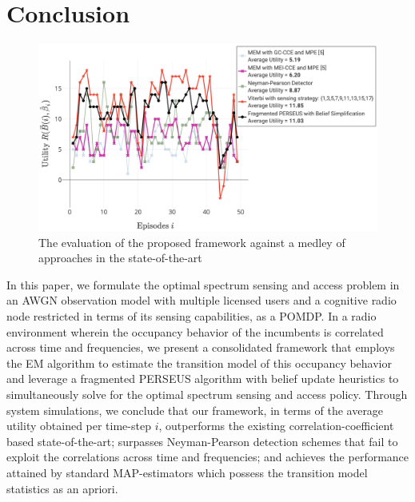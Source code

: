 \documentclass[10pt,twocolumn]{IEEEtran}
\begin{document}
\section{Conclusion}\label{V}
\begin{figure}
    \centering
    \includegraphics[width=0.95\linewidth]{PerformanceEvaluation.png}
    \caption{The evaluation of the proposed framework against a medley of approaches in the state-of-the-art}
    \vspace{-5mm}
    \label{fig:7}
\end{figure}

In this paper, we formulate the optimal spectrum sensing and access problem in an AWGN observation model with multiple licensed users and a cognitive radio node restricted in terms of its sensing capabilities, as a POMDP. In a radio environment wherein the occupancy behavior of the incumbents is correlated across time and frequencies, we present a consolidated framework that employs the EM algorithm to estimate the transition model of this occupancy behavior and leverage a fragmented PERSEUS algorithm with belief update heuristics to simultaneously solve for the optimal spectrum sensing and access policy. Through system simulations, we conclude that our framework, in terms of the average utility obtained per time-step $i$, outperforms the existing correlation-coefficient based state-of-the-art; surpasses Neyman-Pearson detection schemes that fail to exploit the correlations across time and frequencies; and achieves the performance attained by standard MAP-estimators which possess the transition model statistics as an apriori.
\vspace{-2.5mm}


\end{document}
